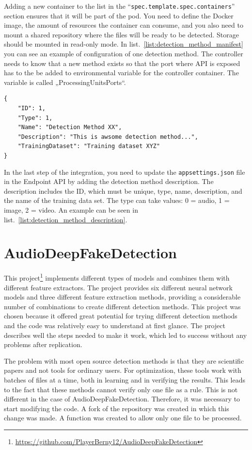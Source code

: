 Adding a new container to the list in the “\texttt{spec.template.spec.containers}” section ensures that it will be part of the pod. You need to define the Docker image, the amount of resources the container can consume, and you also need to mount a shared repository where the files will be ready to be detected. Storage should be mounted in read-only mode. In list.~\ref{list:detection_method_manifest} you can see an example of configuration of one detection method. The controller needs to know that a new method exists so that the port where API is exposed has to the be added to environmental variable for the controller container. The variable is called „ProcessingUnitsPorts“.

\begin{lstlisting}[caption={Detection method description in appsettings.json},label={list:detection_method_description}]
{
    "ID": 1,
    "Type": 1,
    "Name": "Detection Method XX",
    "Description": "This is awsome detection method...",
    "TrainingDataset": "Training dataset XYZ"
}
\end{lstlisting}

In the last step of the integration, you need to update the \texttt{appsettings.json} file in the Endpoint API by adding the detection method description. The description includes the ID, which must be unique, type, name, description, and the name of the training data set. The type can take values: 0 = audio, 1 = image, 2 = video. An example can be seen in list.~\ref{list:detection_method_description}.
\section{AudioDeepFakeDetection}

This project\footnote{\url{https://github.com/PlayerBerny12/AudioDeepFakeDetection}} implements different types of models and combines them with different feature extractors. The project provides six different neural network models and three different feature extraction methods, providing a considerable number of combinations to create different detection methods. This project was chosen because it offered great potential for trying different detection methods and the code was relatively easy to understand at first glance. The project describes well the steps needed to make it work, which led to success without any problems after replication.

The problem with most open source detection methods is that they are scientific papers and not tools for ordinary users. For optimization, these tools work with batches of files at a time, both in learning and in verifying the results. This leads to the fact that these methods cannot verify only one file as a rule. This is not different in the case of AudioDeepFakeDetection. Therefore, it was necessary to start modifying the code. A fork of the repository was created in which this change was made. A function was created to allow only one file to be processed.

